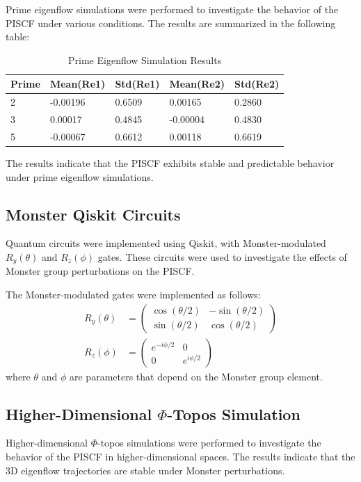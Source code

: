 \documentclass{article}
\theoremstyle{plain}
\begin{document}
Prime eigenflow simulations were performed to investigate the behavior of the PISCF under various conditions. The results are summarized in the following table:

\begin{table}[h!]
\centering
\begin{tabular}{@{}lllll@{}}
\toprule
Prime & Mean(Re1) & Std(Re1) & Mean(Re2) & Std(Re2) \\
\midrule
2 & -0.00196 & 0.6509 & 0.00165 & 0.2860 \\
3 & 0.00017 & 0.4845 & -0.00004 & 0.4830 \\
5 & -0.00067 & 0.6612 & 0.00118 & 0.6619 \\
\bottomrule
\end{tabular}
\caption{Prime Eigenflow Simulation Results}
\label{tab:prime_eigenflow}
\end{table}

The results indicate that the PISCF exhibits stable and predictable behavior under prime eigenflow simulations.

\subsection{Monster Qiskit Circuits}

Quantum circuits were implemented using Qiskit, with Monster-modulated $R_y(\theta)$ and $R_z(\phi)$ gates. These circuits were used to investigate the effects of Monster group perturbations on the PISCF.

The Monster-modulated gates were implemented as follows:
\begin{align}
R_y(\theta) &= \begin{pmatrix} \cos(\theta/2) & -\sin(\theta/2) \\ \sin(\theta/2) & \cos(\theta/2) \end{pmatrix} \\
R_z(\phi) &= \begin{pmatrix} e^{-i\phi/2} & 0 \\ 0 & e^{i\phi/2} \end{pmatrix}
\end{align}
where $\theta$ and $\phi$ are parameters that depend on the Monster group element.

\subsection{Higher-Dimensional $\Phi$-Topos Simulation}

Higher-dimensional $\Phi$-topos simulations were performed to investigate the behavior of the PISCF in higher-dimensional spaces. The results indicate that the 3D eigenflow trajectories are stable under Monster perturbations.
\end{document}
